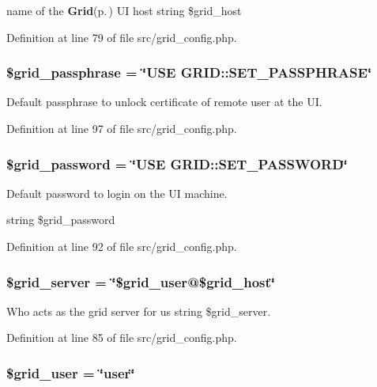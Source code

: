 name of the {\bf Grid}{\rm (p.\,\pageref{classGrid})} UI host  string \$grid\_\-host 



Definition at line 79 of file src/grid\_\-config.php.
\subsubsection{\setlength{\rightskip}{0pt plus 5cm}\$grid\_\-passphrase = \char`\"{}USE GRID::SET\_\-PASSPHRASE\char`\"{}}\label{src_2grid__config_8php_a7}


Default passphrase to unlock certificate of remote user at the UI. 



Definition at line 97 of file src/grid\_\-config.php.
\subsubsection{\setlength{\rightskip}{0pt plus 5cm}\$grid\_\-password = \char`\"{}USE GRID::SET\_\-PASSWORD\char`\"{}}\label{src_2grid__config_8php_a6}


Default password to login on the UI machine. 

string \$grid\_\-password 

Definition at line 92 of file src/grid\_\-config.php.
\subsubsection{\setlength{\rightskip}{0pt plus 5cm}\$grid\_\-server = \char`\"{}\$grid\_\-user@\$grid\_\-host\char`\"{}}\label{src_2grid__config_8php_a5}


Who acts as the grid server for us  string \$grid\_\-server. 



Definition at line 85 of file src/grid\_\-config.php.
\subsubsection{\setlength{\rightskip}{0pt plus 5cm}\$grid\_\-user = \char`\"{}user\char`\"{}}\label{src_2grid__config_8php_a3}


